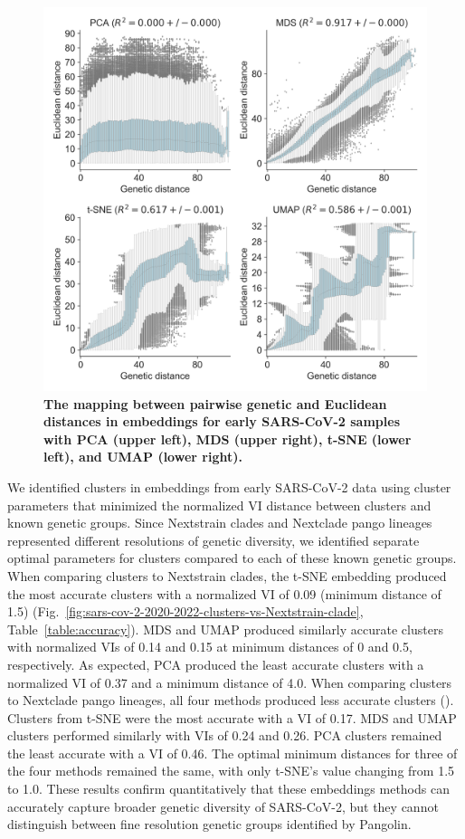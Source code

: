 \documentclass[10pt,letterpaper]{article}
\begin{document}
\begin{figure}[!h]
\includegraphics[width=\columnwidth]{figures/sarscov2-euclidean-distance-by-genetic-distance.png}
\caption{{\bf The mapping between pairwise genetic and Euclidean distances in embeddings for early SARS-CoV-2 samples with PCA (upper left), MDS (upper right), t-SNE (lower left), and UMAP (lower right).}}
\label{fig:sars-cov-2-pairwise-distances}
\end{figure}

We identified clusters in embeddings from early SARS-CoV-2 data using cluster parameters that minimized the normalized VI distance between clusters and known genetic groups.
Since Nextstrain clades and Nextclade pango lineages represented different resolutions of genetic diversity, we identified separate optimal parameters for clusters compared to each of these known genetic groups.
When comparing clusters to Nextstrain clades, the t-SNE embedding produced the most accurate clusters with a normalized VI of 0.09 (minimum distance of 1.5) (Fig.~\ref{fig:sars-cov-2-2020-2022-clusters-vs-Nextstrain-clade}, Table~\ref{table:accuracy}).
MDS and UMAP produced similarly accurate clusters with normalized VIs of 0.14 and 0.15 at minimum distances of 0 and 0.5, respectively.
As expected, PCA produced the least accurate clusters with a normalized VI of 0.37 and a minimum distance of 4.0.
When comparing clusters to Nextclade pango lineages, all four methods produced less accurate clusters ().
Clusters from t-SNE were the most accurate with a VI of 0.17.
MDS and UMAP clusters performed similarly with VIs of 0.24 and 0.26.
PCA clusters remained the least accurate with a VI of 0.46.
The optimal minimum distances for three of the four methods remained the same, with only t-SNE's value changing from 1.5 to 1.0.
These results confirm quantitatively that these embeddings methods can accurately capture broader genetic diversity of SARS-CoV-2, but they cannot distinguish between fine resolution genetic groups identified by Pangolin.
\end{document}
